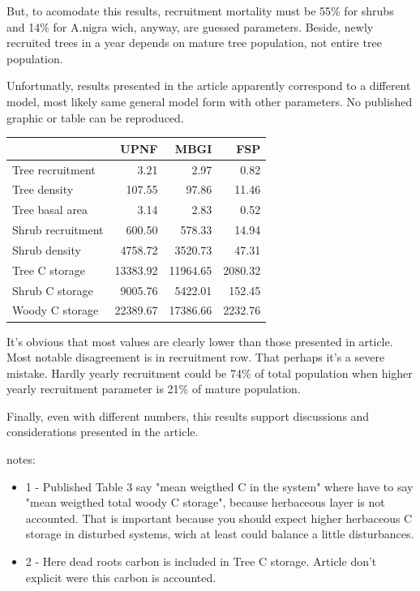 \documentclass[11pt,a4paper,numbers=enddot]{scrartcl}
\begin{document}
   But, to acomodate this results, recruitment mortality must be 55\% for shrubs and 14\% for A.nigra wich, anyway, are guessed parameters.
   Beside, newly recruited trees in a year depends on mature tree population, not entire tree population.


   Unfortunatly, results presented in the article apparently correspond to a different model, most likely same general model form with other parameters. No published graphic or table can be reproduced.
    \begin{center}
    \begin{tabular}{ l r r r}
                    &     UPNF     &       MBGI    &       FSP   \\
\hline
 Tree recruitment   &       3.21   &        2.97   &       0.82  \\ 
 Tree density       &     107.55   &       97.86   &      11.46  \\
 Tree basal area    &       3.14   &        2.83   &       0.52  \\
 Shrub recruitment  &     600.50   &      578.33   &      14.94 \\ 
 Shrub density      &    4758.72   &     3520.73   &      47.31  \\ 
 Tree C storage     &   13383.92   &    11964.65   &    2080.32 \\
 Shrub C storage    &    9005.76   &     5422.01   &     152.45  \\
 Woody C storage    &   22389.67   &    17386.66   &    2232.76  \\
\end{tabular}
\end{center}



   It's obvious that most values are clearly lower than those presented in article. 
   Most notable disagreement is in recruitment row. That perhaps it's a severe mistake. Hardly yearly recruitment could be 74\% of total population when higher yearly recruitment parameter is 21\% of mature population.

   Finally, even with different numbers, this results support discussions and considerations presented in the article.

notes:   \begin{itemize}
     \item 1 - Published Table 3 say "mean weigthed C in the system" where have to say "mean weigthed total woody C storage", because herbaceous layer is not accounted. That is important because you should expect higher herbaceous C storage in disturbed systems, wich at least could balance a little disturbances.
      \item 2 - Here dead roots carbon is included in Tree C storage. Article don't explicit were this carbon is accounted.
        \end{itemize}
\end{document}
